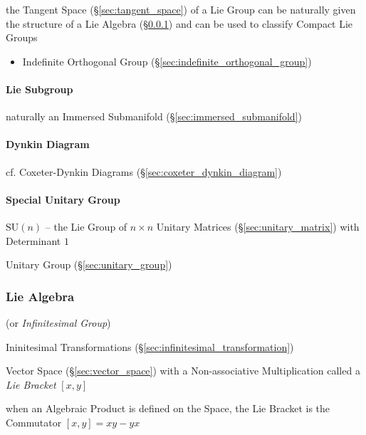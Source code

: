 \begin{itemize}
the Tangent Space (\S\ref{sec:tangent_space}) of a Lie Group can be naturally
given the structure of a Lie Algebra (\S\ref{sec:lie_algebra}) and can be used
to classify Compact Lie Groups

\begin{itemize}
  \item Indefinite Orthogonal Group (\S\ref{sec:indefinite_orthogonal_group})
\end{itemize}



\paragraph{Lie Subgroup}\label{sec:lie_subgroup}\hfill

naturally an Immersed Submanifold (\S\ref{sec:immersed_submanifold})



\paragraph{Dynkin Diagram}\label{sec:dynkin_diagram}\hfill

cf. Coxeter-Dynkin Diagrams (\S\ref{sec:coxeter_dynkin_diagram})



\paragraph{Special Unitary Group}\label{sec:special_unitary}\hfill

$\mathrm{SU}(n)$ -- the Lie Group of $n \times n$ Unitary Matrices
(\S\ref{sec:unitary_matrix}) with Determinant $1$

Unitary Group (\S\ref{sec:unitary_group})



\subsubsection{Lie Algebra}\label{sec:lie_algebra}

(or \emph{Infinitesimal Group})

Ininitesimal Transformations
(\S\ref{sec:infinitesimal_transformation})

Vector Space (\S\ref{sec:vector_space}) with a Non-associative
Multiplication called a \emph{Lie Bracket} $[x,y]$

when an Algebraic Product is defined on the Space, the Lie Bracket is
the Commutator $[x,y] = xy - yx$ %


\end{itemize}
